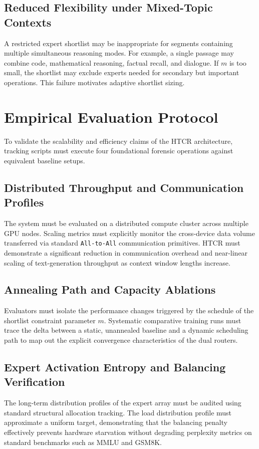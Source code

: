 \section{Reduced Flexibility under Mixed-Topic Contexts}

A restricted expert shortlist may be inappropriate for segments containing multiple simultaneous reasoning modes. For example, a single passage may combine code, mathematical reasoning, factual recall, and dialogue. If $m$ is too small, the shortlist may exclude experts needed for secondary but important operations. This failure motivates adaptive shortlist sizing.

\chapter{Empirical Evaluation Protocol}

To validate the scalability and efficiency claims of the HTCR architecture, tracking scripts must execute four foundational forensic operations against equivalent baseline setups.

\section{Distributed Throughput and Communication Profiles}
The system must be evaluated on a distributed compute cluster across multiple GPU nodes. Scaling metrics must explicitly monitor the cross-device data volume transferred via standard \texttt{All-to-All} communication primitives. HTCR must demonstrate a significant reduction in communication overhead and near-linear scaling of text-generation throughput as context window lengths increase.

\section{Annealing Path and Capacity Ablations}
Evaluators must isolate the performance changes triggered by the schedule of the shortlist constraint parameter $m$. Systematic comparative training runs must trace the delta between a static, unannealed baseline and a dynamic scheduling path to map out the explicit convergence characteristics of the dual routers.

\section{Expert Activation Entropy and Balancing Verification}
The long-term distribution profiles of the expert array must be audited using standard structural allocation tracking. The load distribution profile must approximate a uniform target, demonstrating that the balancing penalty effectively prevents hardware starvation without degrading perplexity metrics on standard benchmarks such as MMLU and GSM8K.

